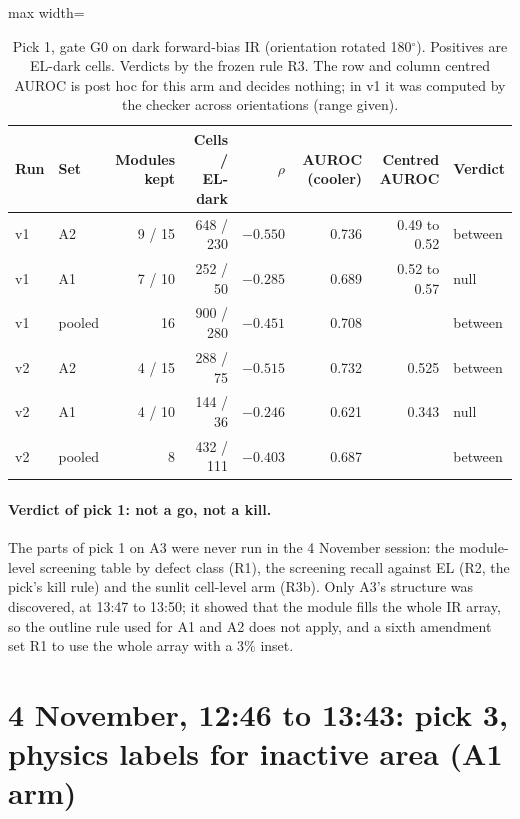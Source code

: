 \begin{table}[htbp]
\centering\small
\caption{Pick 1, gate G0 on dark forward-bias IR (orientation rotated 180$^{\circ}$). Positives are EL-dark cells. Verdicts by the
frozen rule R3. The row and column centred AUROC is post hoc for this arm and decides nothing; in v1 it was computed by the checker
across orientations (range given).}
\label{tab:thermal-g0}
\begin{adjustbox}{max width=\linewidth}
\begin{tabular}{@{}llrrrrrl@{}}
\toprule
Run & Set & Modules kept & Cells / EL-dark & $\rho$ & AUROC (cooler) & Centred AUROC & Verdict \\
\midrule
v1 & A2 & 9 / 15 & 648 / 230 & $-0.550$ & 0.736 & 0.49 to 0.52 & between \\
v1 & A1 & 7 / 10 & 252 / 50 & $-0.285$ & 0.689 & 0.52 to 0.57 & null \\
v1 & pooled & 16 & 900 / 280 & $-0.451$ & 0.708 & & between \\
v2 & A2 & 4 / 15 & 288 / 75 & $-0.515$ & 0.732 & 0.525 & between \\
v2 & A1 & 4 / 10 & 144 / 36 & $-0.246$ & 0.621 & 0.343 & null \\
v2 & pooled & 8 & 432 / 111 & $-0.403$ & 0.687 & & between \\
\bottomrule
\end{tabular}
\end{adjustbox}
\end{table}

\paragraph{Verdict of pick 1: not a go, not a kill.} The parts of pick 1 on A3 were never run in the 4 November session: the
module-level screening table by defect class (R1), the screening recall against EL (R2, the pick's kill rule) and the sunlit cell-level
arm (R3b). Only A3's structure was discovered, at 13:47 to 13:50; it showed that the module fills the whole IR array, so the outline rule
used for A1 and A2 does not apply, and a sixth amendment set R1 to use the whole array with a 3\% inset.

\section{4 November, 12:46 to 13:43: pick 3, physics labels for inactive area (A1 arm)}\label{sec:thermal-pick3}

